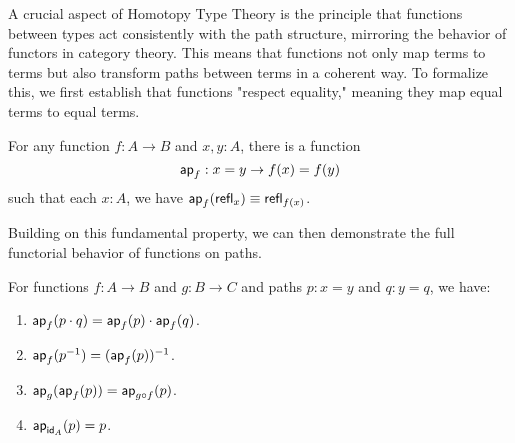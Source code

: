 \documentclass[main.tex]{subfiles}
\begin{document}
A crucial aspect of Homotopy Type Theory is the principle that functions between types act consistently with the path structure, mirroring the behavior of functors in category theory. This means that functions not only map terms to terms but also transform paths between terms in a coherent way. To formalize this, we first establish that functions "respect equality," meaning they map equal terms to equal terms.
\begin{lemma}
    For any function $f : A \to B$ and $x,y : A$, there is a function
    $$\mathsf{ap}_{f}: x = y \to f(x) = f(y)$$
    such that each $x : A$, we have $\mathsf{ap}_{f}(\mathsf{refl}_{x}) \equiv \mathsf{refl}_{f(x)}$.
\end{lemma}

Building on this fundamental property, we can then demonstrate the full functorial behavior of functions on paths.

\begin{lemma}
    For functions $f : A \to B$ and $g : B \to C$ and paths $p : x = y$ and $q : y = q$, we have:
    \begin{enumerate}
        \item $\mathsf{ap}_{f}(p \cdot q) = \mathsf{ap}_{f}(p)\cdot \mathsf{ap}_{f}(q)$.
        \item $\mathsf{ap}_{f}(p^{-1}) = (\mathsf{ap}_{f}(p))^{-1}$.
        \item $\mathsf{ap}_{g}(\mathsf{ap}_{f}(p)) = \mathsf{ap}_{g \circ f}(p)$.
        \item $\mathsf{ap}_{\mathsf{id}_{A}}(p) = p$.
    \end{enumerate}
\end{lemma}
\end{document}
